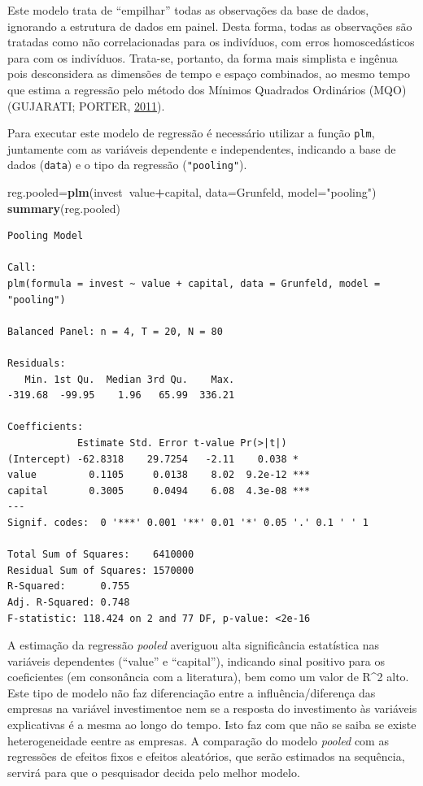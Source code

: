 \documentclass[12pt,brazil,oneside]{book}
\newenvironment{Shaded}{\begin{snugshade}}{\end{snugshade}}
\newcommand{\DataTypeTok}[1]{\textcolor[rgb]{0.13,0.29,0.53}{#1}}
\newcommand{\KeywordTok}[1]{\textcolor[rgb]{0.13,0.29,0.53}{\textbf{#1}}}
\newcommand{\NormalTok}[1]{#1}
\newcommand{\OperatorTok}[1]{\textcolor[rgb]{0.81,0.36,0.00}{\textbf{#1}}}
\newcommand{\StringTok}[1]{\textcolor[rgb]{0.31,0.60,0.02}{#1}}
\begin{document}
Este modelo trata de ``empilhar'' todas as observações da base de dados,
ignorando a estrutura de dados em painel. Desta forma, todas as
observações são tratadas como não correlacionadas para os indivíduos,
com erros homoscedásticos para com os indivíduos. Trata-se, portanto, da
forma mais simplista e ingênua pois desconsidera as dimensões de tempo e
espaço combinados, ao mesmo tempo que estima a regressão pelo método dos
Mínimos Quadrados Ordinários (MQO) (GUJARATI; PORTER,
\protect\hyperlink{ref-Gujarati2011}{2011}).

Para executar este modelo de regressão é necessário utilizar a função
\texttt{plm}, juntamente com as variáveis dependente e independentes,
indicando a base de dados (\texttt{data}) e o tipo da regressão
(\texttt{"pooling"}).

\begin{Shaded}
\begin{Highlighting}[]
\NormalTok{reg.pooled=}\KeywordTok{plm}\NormalTok{(invest}\OperatorTok{~}\NormalTok{value}\OperatorTok{+}\NormalTok{capital, }
               \DataTypeTok{data=}\NormalTok{Grunfeld, }\DataTypeTok{model=}\StringTok{"pooling"}\NormalTok{)}
\KeywordTok{summary}\NormalTok{(reg.pooled)}
\end{Highlighting}
\end{Shaded}

\begin{verbatim}
Pooling Model

Call:
plm(formula = invest ~ value + capital, data = Grunfeld, model = "pooling")

Balanced Panel: n = 4, T = 20, N = 80

Residuals:
   Min. 1st Qu.  Median 3rd Qu.    Max. 
-319.68  -99.95    1.96   65.99  336.21 

Coefficients:
            Estimate Std. Error t-value Pr(>|t|)    
(Intercept) -62.8318    29.7254   -2.11    0.038 *  
value         0.1105     0.0138    8.02  9.2e-12 ***
capital       0.3005     0.0494    6.08  4.3e-08 ***
---
Signif. codes:  0 '***' 0.001 '**' 0.01 '*' 0.05 '.' 0.1 ' ' 1

Total Sum of Squares:    6410000
Residual Sum of Squares: 1570000
R-Squared:      0.755
Adj. R-Squared: 0.748
F-statistic: 118.424 on 2 and 77 DF, p-value: <2e-16
\end{verbatim}

A estimação da regressão \emph{pooled} averiguou alta significância
estatística nas variáveis dependentes (``value'' e ``capital''),
indicando sinal positivo para os coeficientes (em consonância com a
literatura), bem como um valor de R\^{}2 alto. Este tipo de modelo não
faz diferenciação entre a influência/diferença das empresas na variável
investimentoe nem se a resposta do investimento às variáveis
explicativas é a mesma ao longo do tempo. Isto faz com que não se saiba
se existe heterogeneidade eentre as empresas. A comparação do modelo
\emph{pooled} com as regressões de efeitos fixos e efeitos aleatórios,
que serão estimados na sequência, servirá para que o pesquisador decida
pelo melhor modelo.
\end{document}
